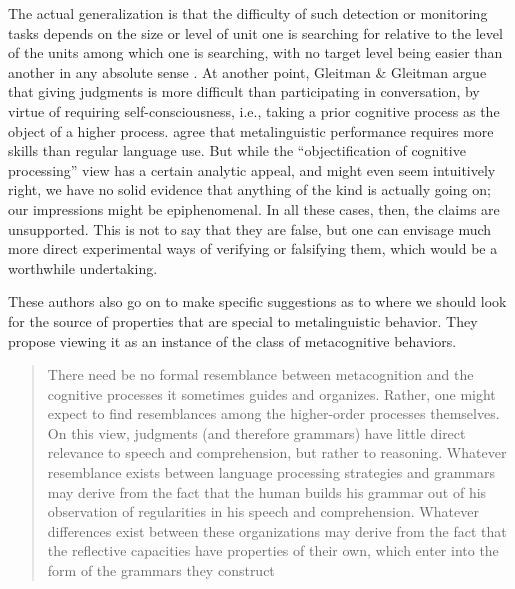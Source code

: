 The actual generalization is that  the difficulty of such detection or monitoring tasks depends on the size or level of unit one is searching for relative to the level of the units among which one is searching, with no target level being easier than another in any absolute sense \citep{McNeillEtAl1973}. At another point, Gleitman \& Gleitman argue that giving judgments is more difficult than participating in conversation, by virtue of requiring self-consciousness, i.e., taking a prior cognitive process as the object of a higher process.  \citet{FillmoreEtAl1979b}
agree that metalinguistic performance requires more skills than regular language use. But while the ``objectification of cognitive processing'' view has a certain analytic appeal, and might even seem intuitively right, we have no solid evidence that anything of the kind is actually going on; our impressions might be epiphenomenal. In all these cases, then, the claims are unsupported. This is not to say that they are false, but one can envisage much more direct experimental ways of verifying or falsifying them, which would be a worthwhile undertaking.

These authors also go on to make specific suggestions as to where we should look for the source of properties that are special to metalinguistic behavior. They propose viewing it as an instance of the class of metacognitive behaviors.
\begin{quote}
 
There need be no formal resemblance between metacognition and the cognitive processes it sometimes guides and organizes. Rather, one might expect to find resemblances among the higher-order processes themselves. On this view, judgments (and therefore grammars) have little direct relevance to speech and comprehension, but rather to reasoning. Whatever resemblance exists between language processing strategies and grammars may derive from the fact that the human builds his grammar out of his observation of regularities in his speech and comprehension. Whatever differences exist between these organizations may derive from the fact that the reflective capacities have   properties of their own, which enter into the form of the grammars they construct  \citep[128]{HirshPasekEtAl1978}
\end{quote} 

